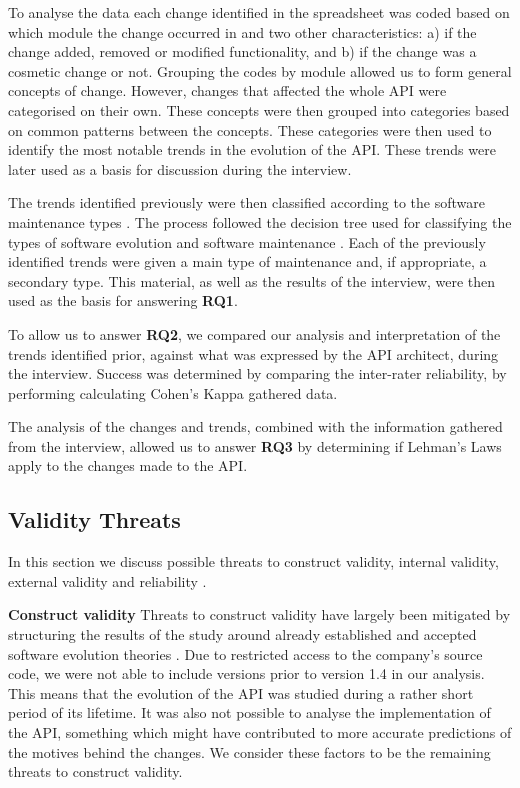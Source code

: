 \documentclass{sig-alternate}
\begin{document}
To analyse the data each change identified in the spreadsheet was coded based on which module the change occurred in and two other characteristics: a) if the change added, removed or modified functionality, and b) if the change was a cosmetic change or not.
Grouping the codes by module allowed us to form general concepts of change. However, changes that affected the whole API were categorised on their own.
These concepts were then grouped into categories based on common patterns between the concepts.
These categories were then used to identify the most notable trends in the evolution of the API. These trends were later used as a basis for discussion during the interview.

The trends identified previously were then classified according to the software maintenance types \cite{chapin2001types}. The process followed the decision tree used for classifying the types of software evolution and software maintenance \cite{chapin2001types}. Each of the previously identified trends were given a main type of maintenance and, if appropriate, a secondary type. This material, as well as the results of the interview, were then used as the basis for answering \textbf{RQ1}.

To allow us to answer \textbf{RQ2}, we compared our analysis and interpretation of the trends identified prior, against what was expressed by the API architect, during the interview. Success was determined by comparing the inter-rater reliability, by performing calculating Cohen's Kappa gathered data. 

The analysis of the changes and trends, combined with the information gathered from the interview, allowed us to answer \textbf{RQ3} by determining if Lehman's Laws apply to the changes made to the API. 




\subsection{Validity Threats} \label{validity_threats} %
In this section we discuss possible threats to construct validity, internal validity, external validity and reliability \cite{runeson2009guidelines}.

\smallskip \noindent
\textbf{Construct validity  } Threats to construct validity have largely been mitigated by structuring the results of the study around already established and accepted software evolution theories \cite{chapin2001types, lehman90sview}. Due to restricted access to the company's source code, we were not able to include versions prior to version 1.4 in our analysis. This means that the evolution of the API was studied during a rather short period of its lifetime. It was also not possible to analyse the implementation of the API, something which might have contributed to more accurate predictions of the motives behind the changes. We consider these factors to be the remaining threats to construct validity. 
\end{document}
